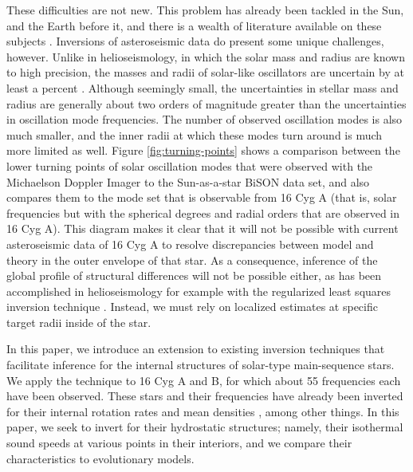 \documentclass[twocolumn,twocolappendix]{aastex6}
\begin{document}
These difficulties are not new. This problem has already been tackled in the Sun, and the Earth before it, and there is a wealth of literature available on these subjects \citep[for a detailed introduction to local and global helioseismology, see e.g.~][]{Kosovichev2011}. Inversions of asteroseismic data do present some unique challenges, however. Unlike in helioseismology, in which the solar mass and radius are known to high precision, the masses and radii of solar-like oscillators are uncertain by at least a percent \citep[see e.g.][]{2013MNRAS.433.1262W,2015MNRAS.452.2127S,Bellinger2016}. Although seemingly small, the uncertainties in stellar mass and radius are generally about two orders of magnitude greater than the uncertainties in oscillation mode frequencies. The number of observed oscillation modes is also much smaller, and the inner radii at which these modes turn around is much more limited as well. Figure \ref{fig:turning-points} shows a comparison between the lower turning points of solar oscillation modes that were observed with the Michaelson Doppler Imager \citep[MDI,][]{1997SoPh..175..287R} to the Sun-as-a-star BiSON data set, and also compares them to the mode set that is observable from 16 Cyg A (that is, solar frequencies but with the spherical degrees and radial orders that are observed in 16 Cyg A). This diagram makes it clear that it will not be possible with current asteroseismic data of 16 Cyg A to resolve discrepancies between model and theory in the outer envelope of that star. As a consequence, inference of the global profile of structural differences will not be possible either, as has been accomplished in helioseismology for example with the regularized least squares inversion technique \citep[RLS, see e.g.][]{1994A&AS..107..421A,basu2017asteroseismic}. Instead, we must rely on localized estimates at specific target radii inside of the star. 

In this paper, we introduce an extension to existing inversion techniques that facilitate inference for the internal structures of solar-type main-sequence stars. We apply the technique to 16 Cyg A and B, for which about 55 frequencies each have been observed. These stars and their frequencies have already been inverted for their internal rotation rates \citep{2015MNRAS.446.2959D} and mean densities \citep{Buldgen2015a}, among other things. In this paper, we seek to invert for their hydrostatic structures; namely, their isothermal sound speeds at various points in their interiors, and we compare their characteristics to evolutionary models. 
\end{document}
